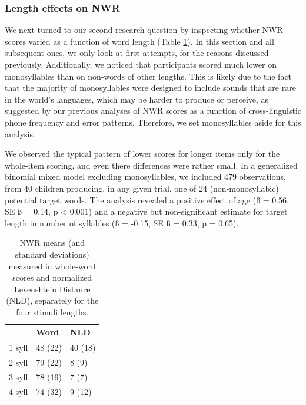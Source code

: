 \documentclass[ %
american, %
,man,floatsintext]{apa6} %
\providecommand{\DIFaddbegin}{} %
\providecommand{\DIFaddend}{} %
\providecommand{\DIFdelbegin}{} %
\providecommand{\DIFdelend}{} %
\newcommand{\DIFscaledelfig}{0.5}
\newlength{\DIFdelgraphicswidth} %
\newlength{\DIFdelgraphicsheight} %
\newcommand{\DIFaddincludegraphics}[2][]{{\color{blue}\fbox{\DIFOincludegraphics[#1]{#2}}}} %
\newcommand{\DIFdelincludegraphics}[2][]{%
	\sbox{\DIFdelgraphicsbox}{\DIFOincludegraphics[#1]{#2}}%
	\settoboxwidth{\DIFdelgraphicswidth}{\DIFdelgraphicsbox} %
	\settoboxtotalheight{\DIFdelgraphicsheight}{\DIFdelgraphicsbox} %
	\scalebox{\DIFscaledelfig}{%
		\parbox[b]{\DIFdelgraphicswidth}{\usebox{\DIFdelgraphicsbox}\\[-\baselineskip] \rule{\DIFdelgraphicswidth}{0em}}\llap{\resizebox{\DIFdelgraphicswidth}{\DIFdelgraphicsheight}{%
				\setlength{\unitlength}{\DIFdelgraphicswidth}%
				\begin{picture}(1,1)%
				\thicklines\linethickness{2pt} %
				{\color[rgb]{1,0,0}\put(0,0){\framebox(1,1){}}}%
				{\color[rgb]{1,0,0}\put(0,0){\line( 1,1){1}}}%
				{\color[rgb]{1,0,0}\put(0,1){\line(1,-1){1}}}%
				\end{picture}%
			}\hspace*{3pt}}} %
} %
\DeclareRobustCommand{\DIFaddbegin}{\DIFOaddbegin \let\includegraphics\DIFaddincludegraphics} %
\DeclareRobustCommand{\DIFaddend}{\DIFOaddend \let\includegraphics\DIFOincludegraphics} %
\DeclareRobustCommand{\DIFdelbegin}{\DIFOdelbegin \let\includegraphics\DIFdelincludegraphics} %
\DeclareRobustCommand{\DIFdelend}{\DIFOaddend \let\includegraphics\DIFOincludegraphics} %
\begin{document}
\DIFdelbegin %
\DIFdelend \DIFaddbegin \hypertarget{length-effects-on-nwr-1}{%
	\subsubsection{Length effects on NWR}\label{length-effects-on-nwr-1}}
\DIFaddend 

We next turned to our second research question by inspecting whether NWR scores varied as a function of word length (Table \ref{tab:tablength}). In this section and all subsequent ones, we only look at first attempts, for the reasons discussed previously. Additionally, we noticed that participants scored much lower on monosyllables than on non-words of other lengths. This is likely due to the fact that the majority of monosyllables were designed to include sounds that are rare in the world's languages, which may be harder to produce or perceive, as suggested by our previous analyses of NWR scores as a function of cross-linguistic phone frequency and error patterns. Therefore, we set monosyllables aside for this analysis.

We observed the typical pattern of lower scores for longer items only for the whole-item scoring, and even there differences were rather small. In a generalized binomial mixed model excluding monosyllables, we included 479 observations, from 40 children producing, in any given trial, one of 24 (non-monosyllabic) potential target words. The analysis revealed a positive effect of age (ß = 0.56, SE ß = 0.14, p \textless{} 0.001) and a negative but non-significant estimate for target length in number of syllables (ß = -0.15, SE ß = 0.33, p = 0.65).

\begin{table}
	
	\caption{\label{tab:tablength}NWR means (and standard deviations) measured in whole-word scores and normalized Levenshtein Distance (NLD), separately for the four stimuli lengths.}
	\centering
	\begin{tabular}[t]{lll}
		\toprule
		& Word & NLD\\
		\midrule
		1 syll & 48 (22) & 40 (18)\\
		2 syll & 79 (22) & 8 (9)\\
		3 syll & 78 (19) & 7 (7)\\
		4 syll & 74 (32) & 9 (12)\\
		\bottomrule
	\end{tabular}
\end{table}
\end{document}
